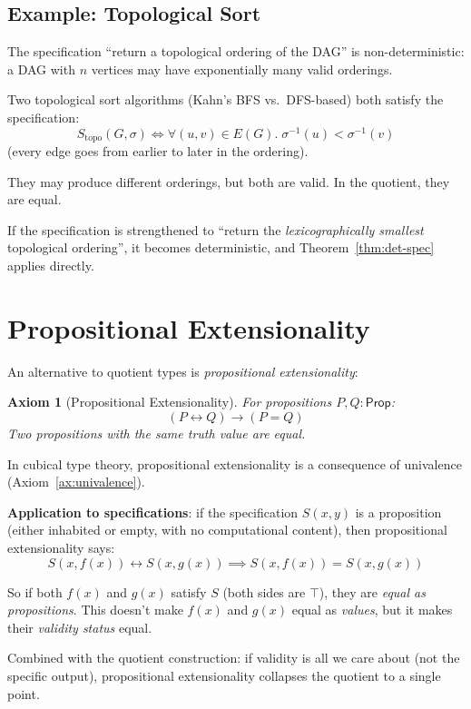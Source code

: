 \documentclass[11pt,a4paper]{report}
\theoremstyle{definition}
\theoremstyle{plain}
\newtheorem{axiom}[definition]{Axiom}
\begin{document}
\subsection{Example: Topological Sort}

The specification ``return a topological ordering of the DAG'' is
non-deterministic: a DAG with $n$ vertices may have exponentially
many valid orderings.

Two topological sort algorithms (Kahn's BFS vs.\ DFS-based) both
satisfy the specification:
\[
  S_{\mathrm{topo}}(G, \sigma) \iff \forall (u,v) \in E(G).\;
    \sigma^{-1}(u) < \sigma^{-1}(v)
\]
(every edge goes from earlier to later in the ordering).

They may produce different orderings, but both are valid.  In the
quotient, they are equal.

If the specification is strengthened to ``return the \emph{lexicographically
smallest} topological ordering'', it becomes deterministic, and
Theorem~\ref{thm:det-spec} applies directly.

\section{Propositional Extensionality}

An alternative to quotient types is \emph{propositional extensionality}:

\begin{axiom}[Propositional Extensionality]
\label{ax:propext}
For propositions $P, Q : \mathsf{Prop}$:
\[
  (P \leftrightarrow Q) \to (P = Q)
\]
Two propositions with the same truth value are \emph{equal}.
\end{axiom}

In cubical type theory, propositional extensionality is a consequence
of univalence (Axiom~\ref{ax:univalence}).

\textbf{Application to specifications}: if the specification $S(x, y)$
is a proposition (either inhabited or empty, with no computational
content), then propositional extensionality says:
\[
  S(x, f(x)) \leftrightarrow S(x, g(x)) \implies
  S(x, f(x)) = S(x, g(x))
\]

So if both $f(x)$ and $g(x)$ satisfy $S$ (both sides are $\top$),
they are \emph{equal as propositions}.  This doesn't make $f(x)$
and $g(x)$ equal as \emph{values}, but it makes their \emph{validity
status} equal.

Combined with the quotient construction: if validity is all we care
about (not the specific output), propositional extensionality
collapses the quotient to a single point.
\end{document}
